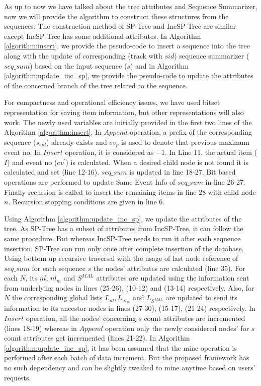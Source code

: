 As up to now we have talked about the tree attributes and Sequence Summarizer, now we will provide the algorithm to construct these structures from the sequences. The construction method of SP-Tree and IncSP-Tree are similar except IncSP-Tree has some additional attributes. In Algorithm \ref{algorithm:insert}, we provide the pseudo-code to insert a sequence into the tree along with the update of corresponding (track with $sid$) sequence summarizer ($seq\_sum$) based on the input sequence ($s$) and in Algorithm \ref{algorithm:update_inc_sp}, we provide the pseudo-code to update the attributes of the concerned branch of the tree related to the sequence.

For compactness and operational efficiency issues, we have used bitset representation for saving item information, but other representations will also work. The newly used variables are initially provided in the first two lines of the Algorithm \ref{algorithm:insert}. In $Append$ operation, a prefix of the corresponding sequence ($s_{sid}$) already exists and $ev_{p}$ is used to denote that previous maximum event no. In $Insert$ operation, it is considered as $-1$. In Line 11, the actual item ($I$) and event no ($ev^{\prime}$) is calculated. When a desired child node is not found it is calculated and set (line 12-16). $seq\_sum$ is updated in line 18-27. Bit based operations are performed to update Same Event Info of $seq\_sum$ in line 26-27. Finally recursion is called to insert the remaining items in line 28 with child node $n$. Recursion stopping conditions are given in line 6.

Using Algorithm \ref{algorithm:update_inc_sp}, we update the attributes of the tree. As SP-Tree has a subset of attributes from IncSP-Tree, it can follow the same procedure. But whereas IncSP-Tree needs to run it after each sequence insertion, SP-Tree can run only once after complete insertion of the database. Using bottom up recursive traversal with the usage of last node reference of $seq\_sum$ for each sequence $s$ the nodes' attributes are calculated (line 35). For each $N$, its $nl$, $nl_{m}$ and $S^{MAL}$ attributes are updated using the information sent from underlying nodes in lines (25-26), (10-12) and (13-14) respectively. Also, for $N$ the corresponding global lists $L_{nl}, L_{nl_{m}}$ and $L_{S^{MAL}}$ are updated to send its information to its ancestor nodes in lines (27-30), (15-17), (21-24) respectively. In $Insert$ operation, all the nodes' concerning $s$ count attributes are incremented (lines 18-19) whereas in $Append$ operation only the newly considered nodes' for $s$ count attributes get incremented (lines 21-22). In  Algorithm \ref{algorithm:update_inc_sp}, it has been assumed that the mine operation is performed after each batch of data increment. But the proposed framework has no such dependency and can be slightly tweaked to mine anytime based on users' requests.






